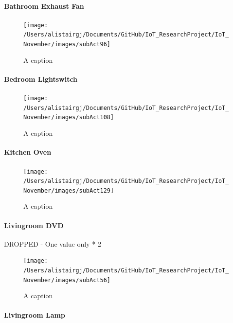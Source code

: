 \documentclass[11pt,]{article}
\let\oldparagraph\paragraph
\renewcommand{\paragraph}[1]{\oldparagraph{#1}\mbox{}}
\begin{document}
\hypertarget{bathroom-exhaust-fan}{%
\paragraph{Bathroom Exhaust Fan}\label{bathroom-exhaust-fan}}

\begin{figure}[H]
\texttt{[image: /Users/alistairgj/Documents/GitHub/IoT\_ResearchProject/IoT\_November/images/subAct96]} \caption{A caption}\label{fig:subAct96}
\end{figure}

\hypertarget{bedroom-lightswitch}{%
\paragraph{Bedroom Lightswitch}\label{bedroom-lightswitch}}

\begin{figure}[H]
\texttt{[image: /Users/alistairgj/Documents/GitHub/IoT\_ResearchProject/IoT\_November/images/subAct108]} \caption{A caption}\label{fig:subAct108}
\end{figure}

\hypertarget{kitchen-oven}{%
\paragraph{Kitchen Oven}\label{kitchen-oven}}

\begin{figure}[H]
\texttt{[image: /Users/alistairgj/Documents/GitHub/IoT\_ResearchProject/IoT\_November/images/subAct129]} \caption{A caption}\label{fig:subAct129}
\end{figure}

\hypertarget{livingroom-dvd}{%
\paragraph{Livingroom DVD}\label{livingroom-dvd}}

DROPPED - One value only * 2

\begin{figure}[H]
\texttt{[image: /Users/alistairgj/Documents/GitHub/IoT\_ResearchProject/IoT\_November/images/subAct56]} \caption{A caption}\label{fig:subAct56}
\end{figure}

\hypertarget{livingroom-lamp}{%
\paragraph{Livingroom Lamp}\label{livingroom-lamp}}
\end{document}
